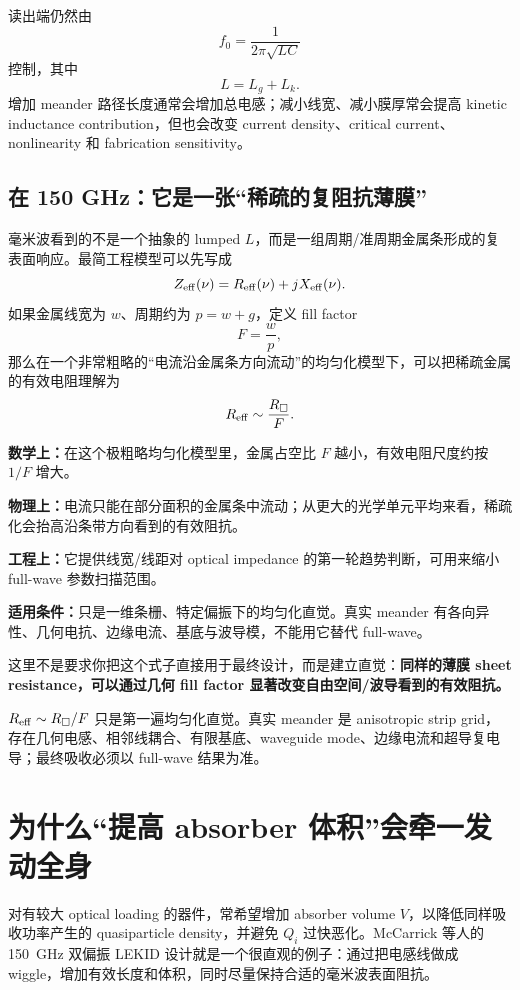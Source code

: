 \documentclass[11pt,a4paper,openany]{ctexrep}
\newcommand{\formulaexplain}[4]{%
\begin{formulaguidebox}
\textbf{\color{KidBlue}数学上：}#1\par
\textbf{\color{KidTeal}物理上：}#2\par
\textbf{\color{KidGold!55!black}工程上：}#3\par
\textbf{\color{KidRed}适用条件：}#4
\end{formulaguidebox}%
}
\begin{document}
读出端仍然由
\[
f_0=\frac{1}{2\pi\sqrt{LC}}
\]
控制，其中
\[
L=L_g+L_k.
\]
增加 meander 路径长度通常会增加总电感；减小线宽、减小膜厚常会提高 kinetic inductance contribution，但也会改变 current density、critical current、nonlinearity 和 fabrication sensitivity。

\subsection{在 150 GHz：它是一张“稀疏的复阻抗薄膜”}

毫米波看到的不是一个抽象的 lumped $L$，而是一组周期/准周期金属条形成的复表面响应。最简工程模型可以先写成
\[
Z_{\rm eff}(\nu)=R_{\rm eff}(\nu)+jX_{\rm eff}(\nu).
\]
如果金属线宽为 $w$、周期约为 $p=w+g$，定义 fill factor
\[
F=\frac{w}{p},
\]
那么在一个非常粗略的“电流沿金属条方向流动”的均匀化模型下，可以把稀疏金属的有效电阻理解为
\[
R_{\rm eff}\sim \frac{R_{\square}}{F}.
\]
\formulaexplain
{在这个极粗略均匀化模型里，金属占空比 $F$ 越小，有效电阻尺度约按 $1/F$ 增大。}
{电流只能在部分面积的金属条中流动；从更大的光学单元平均来看，稀疏化会抬高沿条带方向看到的有效阻抗。}
{它提供线宽/线距对 optical impedance 的第一轮趋势判断，可用来缩小 full-wave 参数扫描范围。}
{只是一维条栅、特定偏振下的均匀化直觉。真实 meander 有各向异性、几何电抗、边缘电流、基底与波导模，不能用它替代 full-wave。}
这里不是要求你把这个式子直接用于最终设计，而是建立直觉：\textbf{同样的薄膜 sheet resistance，可以通过几何 fill factor 显著改变自由空间/波导看到的有效阻抗。}

\begin{mistakebox}
$R_{\rm eff}\sim R_{\square}/F$ 只是第一遍均匀化直觉。真实 meander 是 anisotropic strip grid，存在几何电感、相邻线耦合、有限基底、waveguide mode、边缘电流和超导复电导；最终吸收必须以 full-wave 结果为准。
\end{mistakebox}

\section{为什么“提高 absorber 体积”会牵一发动全身}

对有较大 optical loading 的器件，常希望增加 absorber volume $V$，以降低同样吸收功率产生的 quasiparticle density，并避免 $Q_i$ 过快恶化。McCarrick 等人的 \SI{150}{GHz} 双偏振 LEKID 设计就是一个很直观的例子：通过把电感线做成 wiggle，增加有效长度和体积，同时尽量保持合适的毫米波表面阻抗。
\end{document}
